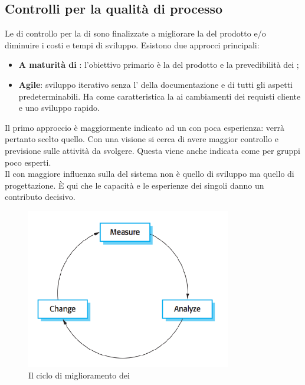 \subsection{Controlli per la qualità di processo}
Le  di controllo per la  di  sono finalizzate a migliorare la  del prodotto e/o diminuire i costi e tempi di sviluppo. Esistono due approcci principali:
\begin{itemize}
\item \textbf{A maturità di }: l'obiettivo primario è la  del prodotto e la prevedibilità dei ;
\item \textbf{Agile}: sviluppo iterativo senza l' della documentazione e di tutti gli aspetti predeterminabili. Ha come caratteristica la  ai cambiamenti dei requisti cliente e uno sviluppo rapido.
\end{itemize}
Il primo approccio è maggiormente indicato ad un  con poca esperienza: verrà pertanto scelto quello. Con una visione  si cerca di avere maggior controllo e previsione sulle attività da svolgere. Questa viene anche indicata come  per gruppi poco esperti.\\
Il  con maggiore influenza sulla  del sistema non è quello di sviluppo ma quello di progettazione. È qui che le capacità e le esperienze dei singoli danno un contributo decisivo.\\
\begin{figure}[h]
\centering \includegraphics[width=0.8\textwidth]{res/sections/processImprovement.png}
\caption{Il ciclo di miglioramento dei }
\end{figure}
